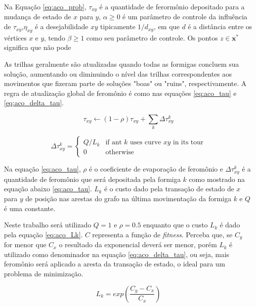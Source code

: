 Na Equação \ref{eq:aco_prob}, $\tau _{xy}$ é a quantidade de ferormônio depositado para a mudança de estado de $x$ para $y$, $\alpha \geq 0$  é um parâmetro de controle da influência de $\tau _{xy}$,$\eta _{xy}$ é a desejabilidade $xy$ tipicamente $1/d_{{xy}}$, em que $d$ é a distância entre os vértices $\textit{x}$ e $\textit{y}$, tendo $\beta  \geq 1$ como seu parâmetro de controle. Os pontos $z\in \mathbf{x^*}$ significa que não pode 

As trilhas geralmente são atualizadas quando todas as formigas concluem sua solução, aumentando ou diminuindo o nível das trilhas correspondentes aos movimentos que fizeram parte de soluções "boas" ou "ruins", respectivamente. A regra de atualização global de feromônio é como nas equações \ref{eq:aco_tau} e \ref{eq:aco_delta_tau}.

\begin{equation}
\label{eq:aco_tau}
    \tau_{xy} \leftarrow
    (1-\rho)\tau_{xy} + \sum_{k}\Delta \tau^{k}_{xy}
\end{equation}

\begin{equation}
\label{eq:aco_delta_tau}
    \Delta{\tau^{k}_{xy}} =
    \begin{cases}
    Q/L_k & \mbox{if ant }k\mbox{ uses curve }xy\mbox{ in its tour} \\
    0 & \mbox{otherwise}
    \end{cases}
\end{equation}

Na equação \ref{eq:aco_tau}, $\rho$ é o coeficiente de evaporação de feromônio e $\Delta \tau _{xy}^{k}$ é a quantidade de feromônio que será depositada pela formiga $k$ como mostrado na equação abaixo \ref{eq:aco_tau}. $L_{k}$ é o custo dado pela transação de estado de $x$ para $y$ de posição nas arestas do grafo na última movimentação da formiga $k$ e $Q$ é uma constante. 

Neste trabalho será utilizado $Q = 1$  e $\rho = 0.5$ enquanto que o custo $L_{k}$ é dado pela equação \ref{eq:aco_Lk}. $C$ representa a função de \textit{fitness}. Perceba que, se $C_y$ for menor que $C_x$ o resultado da exponencial deverá ser menor, porém $L_{k}$ é utilizado como denominador na equação \ref{eq:aco_delta_tau}, ou seja, mais feromônio será aplicado a aresta da transação de estado, o ideal para um problema de minimização.

\begin{equation}
\label{eq:aco_Lk}
    L_{k} =
    exp(\frac{C_y - C_x}{C_x})
\end{equation}

